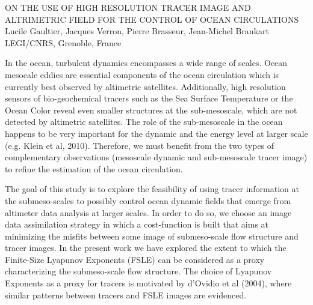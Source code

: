 ON THE USE OF HIGH RESOLUTION TRACER IMAGE AND ALTRIMETRIC FIELD FOR THE CONTROL OF OCEAN CIRCULATIONS
Lucile Gaultier, Jacques Verron, Pierre Brasseur, Jean-Michel Brankart
LEGI/CNRS, Grenoble, France


In the ocean, turbulent dynamics encompasses a wide range of scales. 
Ocean mesocale eddies are essential components of the ocean circulation which is currently best observed by altimetric satellites. 
Additionally, high resolution sensors of bio-geochemical tracers such as the Sea Surface Temperature or the Ocean Color reveal even smaller structures at the sub-mesoscale, which are not detected by altimetric satellites. 
The role of the sub-mesoscale in the ocean happens to be very important for the dynamic and the energy level at larger scale (e.g. Klein et al, 2010). 
Therefore, we must benefit from the two types of complementary observations (mesoscale dynamic and sub-mesoscale tracer image) to refine the estimation of the ocean circulation.


The goal of this study is to explore the feasibility of using tracer information at the submeso-scales to possibly control ocean dynamic fields that emerge from altimeter data analysis at larger scales. 
In order to do so, we choose an image data assimilation strategy in which a cost-function is built that aims at minimizing the misfits between some image of submeso-scale flow structure and tracer images. 
In the present work we have explored the extent to which the Finite-Size Lyapunov Exponents (FSLE) can be considered as a proxy characterizing the submeso-scale flow structure. 
The choice of Lyapunov Exponents as a proxy for tracers is motivated by d'Ovidio et al (2004), where similar patterns between tracers and FSLE images are evidenced. 

